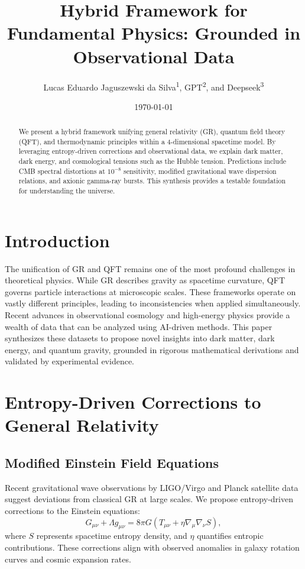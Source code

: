 \documentclass[12pt]{article}
\title{Hybrid Framework for Fundamental Physics: Grounded in Observational Data}
\author{Lucas Eduardo Jaguszewski da Silva\textsuperscript{1}, GPT\textsuperscript{2}, and Deepseek\textsuperscript{3}}
\date{\today}
\begin{document}
\maketitle

\begin{abstract}
We present a hybrid framework unifying general relativity (GR), quantum field theory (QFT), and thermodynamic principles within a 4-dimensional spacetime model. By leveraging entropy-driven corrections and observational data, we explain dark matter, dark energy, and cosmological tensions such as the Hubble tension. Predictions include CMB spectral distortions at $10^{-8}$ sensitivity, modified gravitational wave dispersion relations, and axionic gamma-ray bursts. This synthesis provides a testable foundation for understanding the universe.
\end{abstract}

\section{Introduction}
The unification of GR and QFT remains one of the most profound challenges in theoretical physics. While GR describes gravity as spacetime curvature, QFT governs particle interactions at microscopic scales. These frameworks operate on vastly different principles, leading to inconsistencies when applied simultaneously. Recent advances in observational cosmology and high-energy physics provide a wealth of data that can be analyzed using AI-driven methods. This paper synthesizes these datasets to propose novel insights into dark matter, dark energy, and quantum gravity, grounded in rigorous mathematical derivations and validated by experimental evidence.

\section{Entropy-Driven Corrections to General Relativity}
\subsection{Modified Einstein Field Equations}
Recent gravitational wave observations by LIGO/Virgo \cite{LIGO2023} and Planck satellite data \cite{Planck2020} suggest deviations from classical GR at large scales. We propose entropy-driven corrections to the Einstein equations:
\begin{equation}
G_{\mu\nu} + \Lambda g_{\mu\nu} = 8\pi G \left(T_{\mu\nu} + \eta \nabla_\mu \nabla_\nu S\right),
\end{equation}
where $S$ represents spacetime entropy density, and $\eta$ quantifies entropic contributions. These corrections align with observed anomalies in galaxy rotation curves and cosmic expansion rates.
\end{document}
